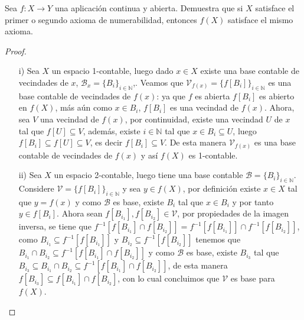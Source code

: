 
\item Sea $f: X \to Y$ una aplicación continua y abierta. Demuestra que si $X$ satisface el primer o segundo axioma de numerabilidad, entonces $f(X)$ satisface el mismo axioma.

\begin{proof}
  \begin{enumerate}
  \item[i)] Sea $X$ un espacio 1-contable, luego dado $x \in X$ existe una base contable de vecindades de $x$, $\mathcal{B}_x=\{B_i\}_{i\in \mathbb{N}}$,. Veamos que $\mathcal{V}_{f(x)}=\{f[B_i]\}_{i\in\mathbb{N}}$ es una base contable de vecindades de $f(x)$: ya que $f$ es abierta $f[B_i]$ es abierto en $f(X)$, más aún como $x \in B_i$, $f[B_i]$ es una vecindad de $f(x)$. Ahora, sea $V$ una vecindad de $f(x)$, por continuidad, existe una vecindad $U$ de $x$ tal que $f[U] \subseteq V$, además, existe $i \in \mathbb{N}$ tal que $x \in B_i \subseteq U$, luego $f[B_i] \subseteq f[U] \subseteq V$, es decir $f[B_i] \subseteq V$. De esta manera $\mathcal{V}_{f(x)}$ es una base contable de vecindades de $f(x)$ y así $f(X)$ es 1-contable.\\ 
  \item [ii)] Sea $X$ un espacio 2-contable, luego tiene una base contable $\mathcal{B} = \{B_i\}_{i \in \mathbb{N}}$. Considere $\mathcal{V} = \{f[B_i]\}_{i\in\mathbb{N}}$ y sea $y \in f(X)$, por definición existe $x \in X$ tal que $y = f(x)$ y como $\mathcal{B}$ es base, existe $B_i$ tal que $x \in B_i$ y por tanto $y \in f[B_i]$. Ahora sean $f[B_{i_1}], f[B_{i_2}] \in \mathcal{V}$, por propiedades de la imagen inversa, se tiene que $f^{-1}[f[B_{i_1}]\cap f[B_{i_2}]]=f^{-1}[f[B_{i_1}]]\cap f^{-1}[f[B_{i_2}]]$, como $B_{i_1}\subseteq f^{-1}[f[B_{i_1}]]$ y $B_{i_2} \subseteq f^{-1}[f[B_{i_2}]]$ tenemos que $B_{i_1} \cap B_{i_2} \subseteq f^{-1}[f[B_{i_1}]\cap f[B_{i_2}]]$ y como $\mathcal{B}$ es base, existe $B_{i_3}$ tal que $B_{i_3} \subseteq B_{i_1} \cap B_{i_2} \subseteq f^{-1}[f[B_{i_1}]\cap f[B_{i_2}]]$, de esta manera $f[B_{i_3}] \subseteq f[B_{i_1}] \cap f[B_{i_2}]$, con lo cual concluimos que $\mathcal{V}$ es base para $f(X)$.

  \end{enumerate}
\end{proof}